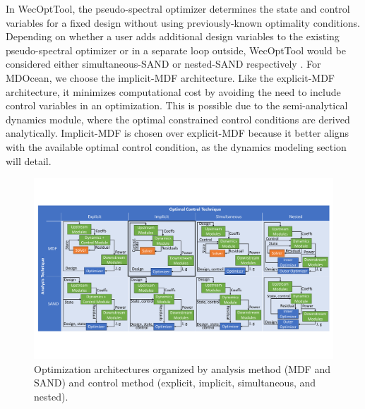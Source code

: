 In WecOptTool, the pseudo-spectral optimizer determines the state and control variables for a fixed design without using previously-known optimality conditions.
Depending on whether a user adds additional design variables to the existing pseudo-spectral optimizer or in a separate loop outside, WecOptTool would be considered either simultaneous-SAND or nested-SAND respectively \cite{coe_initial_2020}.
For MDOcean, we choose the implicit-MDF architecture. Like the explicit-MDF architecture, it minimizes computational cost by avoiding the need to include control variables in an optimization.
This is possible due to the semi-analytical dynamics module, where the optimal constrained control conditions are derived analytically.
Implicit-MDF is chosen over explicit-MDF because it better aligns with the available optimal control condition, as the dynamics modeling section will detail.

\begin{figure}
\centering
\includegraphics[width=1.1\linewidth]{../renewable-energy-mdo/figs/control_analysis_flowcharts_2.pdf}
\caption{Optimization architectures organized by analysis method (MDF and SAND) and control method (explicit, implicit, simultaneous, and nested).}
\label{fig:control-arch}
\end{figure}